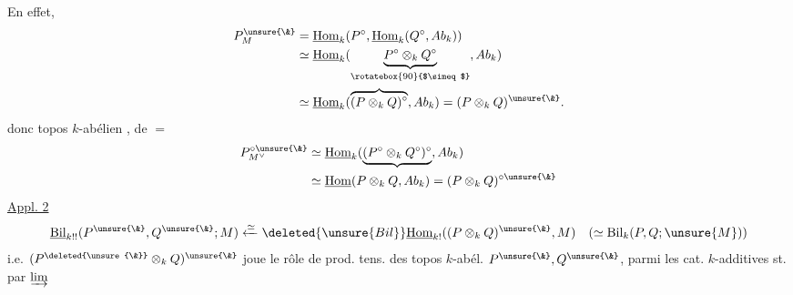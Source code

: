 En effet,
\[
\begin{aligned}
P_M^{\unsure{\&}}&=\underline{\mathrm{Hom}}_k(P^\circ,\underline{\mathrm{Hom}}_k(Q^\circ,Ab_k))\\
&\simeq\underline{\mathrm{Hom}}_k(\underbrace{P^\circ\otimes_kQ^\circ}_{\rotatebox{90}{$\simeq$}},Ab_k)\\
&\simeq\underline{\mathrm{Hom}}_k(\overbrace{(P\otimes_kQ)^\circ},Ab_k)
=(P\otimes_kQ)^{\unsure{\&}}.
\end{aligned}
\]
donc topos $k$-abélien , de $=$
\[
\begin{aligned}
P_{M^\vee}^{\circ\unsure{\&}}&\simeq\underline{\mathrm{Hom}}_k(
\underbrace{(P^\circ\otimes_kQ^\circ)^\circ},Ab_k)\\
&\simeq\underline{\mathrm{Hom}}(P\otimes_kQ,Ab_k)
=(P\otimes_kQ)^{\circ\unsure{\&}}
\end{aligned}
\]
\uline{Appl. 2}
\[
\underline{\operatorname{Bil}}_{k!!}(P^{\unsure{\&}},Q^{\unsure{\&}};M)
\xleftarrow{\simeq}\deleted{\unsure{Bil}}
\underline{\mathrm{Hom}}_{k!}((P\otimes_kQ)^{\unsure{\&}},M)
\quad(\simeq\operatorname{Bil}_k(P,Q;\unsure{M}))
\]
\margin{$\unsure{*}$}
i.e. $(P^{\deleted{\unsure{\&}}}\otimes_kQ)^{\unsure{\&}}$
joue le rôle de prod. tens. des topos $k$-abél. $P^{\unsure{\&}},Q^{\unsure{\&}}$,
parmi les cat. $k$-additives st. par $\varinjlim$
